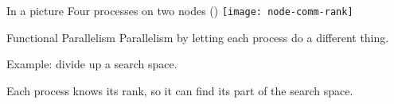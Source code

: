 
\begin{exerciseframe}[commrank]
  
\end{exerciseframe}

\begin{exerciseframe}[commrank]
  
\end{exerciseframe}

\begin{optexerciseframe}
  
\end{optexerciseframe}


\begin{frame}{In a picture}
  Four processes on two nodes ()
  \texttt{[image: node-comm-rank]}
\end{frame}


\begin{frame}{Functional Parallelism}
  Parallelism by letting each process do a different thing.

  Example: divide up a search space.

  Each process knows its rank, so it can find its part of the search space.
\end{frame}

\begin{exerciseframe}[prime]
  
\end{exerciseframe}

\endinput

\begin{frame}[containsverbatim]\frametitle{}
\begin{lstlisting}
  
\end{lstlisting}
\end{frame}

